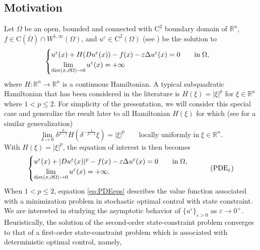 \documentclass[11pt,reqno]{amsart}
\numberwithin{figure}{section}
\theoremstyle{plain}
\theoremstyle{remark}
\numberwithin{equation}{section}
\newcommand{\R}{\mathbb{R}}
\begin{document}
\subsection{Motivation} Let $\Omega$ be an open, bounded and connected with $\mathrm{C}^2$ boundary domain of $\mathbb{R}^n$, %
 $f\in \mathrm{C}(\overline{\Omega})\cap W^{1,\infty}(\Omega)$, and $u^\varepsilon\in \mathrm{C}^2(\Omega)$ (see \cite{Lasry1989}) be the solution to
 \begin{equation}\label{eq:PDEepsa}
    \begin{cases}
      u^\varepsilon(x) + H(Du^\varepsilon(x)) - f(x) - \varepsilon \Delta u^\varepsilon(x) = 0 \qquad
    \text{in}\;\Omega, \vspace{0cm}\\
    \displaystyle  \lim_{\mathrm{dist}(x,\partial \Omega)\to 0} u^\varepsilon(x) = +\infty
    \end{cases} 
\end{equation}
 where $H:\R^n\to\R^n$ is a continuous Hamiltonian. A typical subquadratic Hamiltonian that has been considered in the literature is $H(\xi) = |\xi|^p$ for $\xi\in \R^n$ where $1<p\leq 2$. For simplicity of the presentation, we will consider this special case and generalize the result later to all Hamiltonian $H(\xi)$ for which (see \cite{sardarli_ergodic_2021} for a similar generalization)
 \begin{equation*}
     \lim_{\delta\to 0}\delta^{\frac{p}{p-1}}H\left(\delta^{-\frac{1}{p-1}}\xi\right) = |\xi|^p \qquad\text{locally uniformly in}\;\xi\in \R^n.
 \end{equation*}
 With $H(\xi) = |\xi|^p$, the equation of interest is then becomes
\begin{equation}\label{eq:PDEeps}
    \begin{cases}
      u^\varepsilon(x) + |Du^\varepsilon(x)|^p - f(x) - \varepsilon \Delta u^\varepsilon(x) = 0 \qquad
    \text{in}\;\Omega, \vspace{0cm}\\
    \displaystyle  \lim_{\mathrm{dist}(x,\partial \Omega)\to 0} u^\varepsilon(x) = +\infty.
    \end{cases} \tag{PDE$_\varepsilon$}
\end{equation}
When $1<p\leq 2$, equation \eqref{eq:PDEeps} describes the value function associated with a minimization problem in stochastic optimal control with state constraint. We are interested in studying the asymptotic behavior of $\{u^\varepsilon\}_{\varepsilon>0}$ as $\varepsilon\rightarrow 0^+$. Heuristically, the solution of the second-order state-constraint problem converges to that of a first-order state-constraint problem which is associated with deterministic optimal control, namely,
\end{document}
